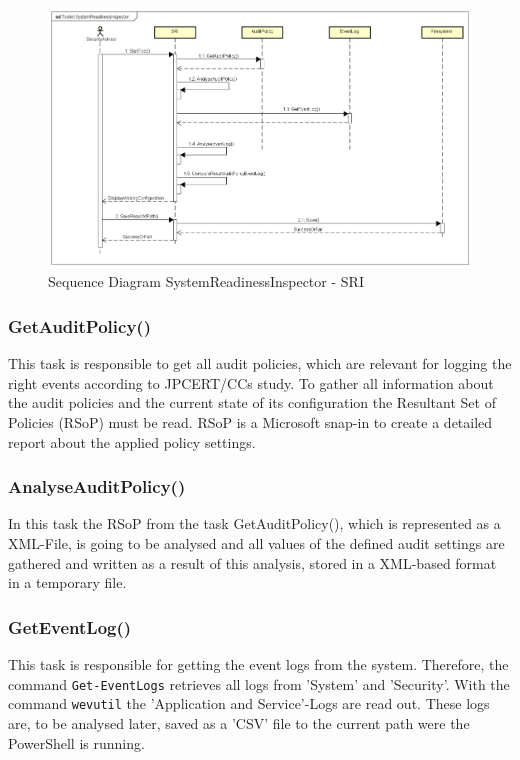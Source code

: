 \begin{figure}[H]
    \centering
    \includegraphics[width=1\linewidth]{assets/design-tool/SequenceDiagramSRI.png}
    \caption{Sequence Diagram SystemReadinessInspector - SRI}
\end{figure}

\subsubsection{GetAuditPolicy()}
This task is responsible to get all audit policies, which are relevant for logging the right events according to JPCERT/CCs study. To gather all information about the audit policies and the current state of its configuration  the Resultant Set of Policies (RSoP) must be read. \cite{RSoP} RSoP is a Microsoft snap-in to create a detailed report about the applied policy settings. 

\subsubsection{AnalyseAuditPolicy()}
In this task the RSoP from the task GetAuditPolicy(), which is represented as a XML-File, is going to be analysed and all values of the defined audit settings are gathered and written as a result of this analysis, stored in a XML-based format in a temporary file.

\subsubsection{GetEventLog()}
This task is responsible for getting the event logs from the system. Therefore, the command \lstinline|Get-EventLogs| \cite{Get-EventLogs} retrieves all logs from 'System' and 'Security'. With the command \lstinline|wevutil| the 'Application and Service'-Logs are read out. These logs are, to be analysed later, saved as a 'CSV' file to the current path were the PowerShell is running.

